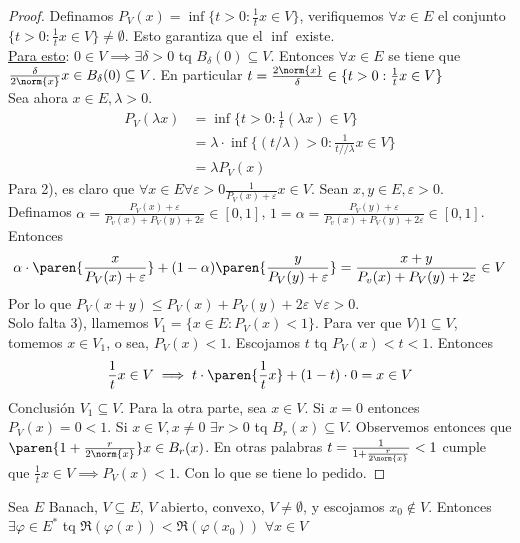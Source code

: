 \documentclass{notetaking}
\begin{document}
\begin{proof}
    Definamos \(P_V(x)=\inf\{t>0:\frac1tx\in V\}\), verifiquemos \(\forall x\in E\) el conjunto \(\{t>0:\frac1tx\in V\}\neq\emptyset\). Esto garantiza que el \(\inf\) existe.\\
    \underline{Para esto}: \(0\in V\implies\exists\delta>0\) tq \(B_\delta(0)\subseteq V\). Entonces \(\forall x\in E\) se tiene que \(\frac\delta{2\norm{x}}x\in B_\delta(0)\subseteq V\). En particular \(t=\frac{2\norm{x}}\delta\in\{t>0:\frac1tx\in V\}\)\\
    Sea ahora \(x\in E,\lambda>0\).
    \begin{align*}
        P_V(\lambda x)&=\inf\{t>0:\frac1t(\lambda x)\in V\}\\
        &=\lambda\cdot\inf\{(t/\lambda)>0:\frac1{t//\lambda}x\in V\}\\
        &=\lambda P_V(x)
    \end{align*}
    Para 2), es claro que \(\forall x\in E\forall\varepsilon>0\frac1{P_V(x)+\varepsilon}x\in V\). Sean \(x,y\in E,\varepsilon>0\). Definamos \(\alpha=\frac{P_V(x)+\varepsilon}{P_v(x)+P_V(y)+2\varepsilon}\in[0,1]\), \(1=\alpha=\frac{P_V(y)+\varepsilon}{P_v(x)+P_V(y)+2\varepsilon}\in[0,1]\).\\
    Entonces
    \begin{align*}
        \alpha\cdot\paren{\frac{x}{P_V(x)+\varepsilon}}+(1-\alpha)\paren{\frac{y}{P_V(y)+\varepsilon}}=\frac{x+y}{P_v(x)+P_V(y)+2\varepsilon}\in V
    \end{align*}
    Por lo que \(P_V(x+y)\leq P_V(x)+P_V(y)+2\varepsilon\) \(\forall \varepsilon>0\).\\
    Solo falta 3), llamemos \(V_1=\{x\in E:P_V(x)<1\}\). Para ver que \(V)1\subseteq V\), tomemos \(x\in V_1\), o sea, \(P_V(x)<1\). Escojamos \(t\) tq \(P_V(x)<t<1\). Entonces
    \begin{equation*}
        \frac1tx\in V\implies t\cdot\paren{\frac1tx}+(1-t)\cdot 0=x\in V
    \end{equation*}
    Conclusión \(V_1\subseteq V\). Para la otra parte, sea \(x\in V\). Si \(x=0\) entonces \(P_V(x)=0<1\). Si \(x\in V,x\neq 0\) \(\exists r>0\) tq \(B_r(x)\subseteq V\). Observemos entonces que \(\paren{1+\frac{r}{2\norm{x}}}x\in B_r(x)\). En otras palabras \(t=\frac1{1+\frac{r}{2\norm{x}}}<1\) cumple que \(\frac1tx\in V\implies P_V(x)<1\). Con lo que se tiene lo pedido.
\end{proof}

\begin{lem}
    Sea \(E\) Banach, \(V\subseteq E\), \(V\) abierto, convexo, \(V\neq\emptyset\), y escojamos \(x_0\notin V\). Entonces \(\exists \varphi\in E^*\) tq \(\Re(\varphi(x))<\Re(\varphi(x_0))\) \(\forall x\in V\)
\end{lem}
\end{document}
